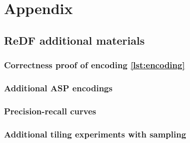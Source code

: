 \chapter{Appendix}\label{ch:redf_appendix}
\newcommand{\redfappenxid}{chapters/myappendix/tex}

\section{ReDF additional materials}
\subsection{Correctness proof of encoding \ref{lst:encoding}}
\label{proof:tiling}

\subsection{Additional ASP encodings}
\label{ASP_appendix}

\subsection{Precision-recall curves}\label{appendix:precision_recall}

\subsection{Additional tiling experiments with sampling}\label{appendix:extra_experiment_with_alpha}



\cleardoublepage

